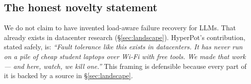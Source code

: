 \subsection{The honest novelty statement}
We do not claim to have invented load-aware failure recovery for LLMs. That
already exists in datacenter research (\S\ref{sec:landscape}). HyperPot's
contribution, stated safely, is: \emph{``Fault tolerance like this exists in
datacenters. It has never run on a pile of cheap student laptops over Wi-Fi with
free tools. We made that work --- and here, watch, we kill one.''} This framing
is defensible because every part of it is backed by a source in
\S\ref{sec:landscape}.
